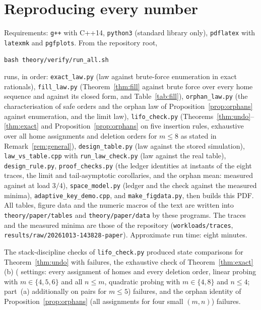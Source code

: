 \documentclass[11pt,a4paper]{article}
\theoremstyle{definition}
\theoremstyle{remark}
\newcommand{\code}[1]{\texttt{#1}}
\begin{document}
\section{Reproducing every number}\label{app:repro}\sloppy
Requirements: \code{g++} with C++14, \code{python3} (standard library only), \code{pdflatex} with \code{latexmk} and \code{pgfplots}. From the repository root,
\begin{center}\code{bash theory/verify/run\_all.sh}\end{center}
runs, in order: \code{exact\_law.py} (law against brute-force enumeration in exact rationals), \code{fill\_law.py} (Theorem~\ref{thm:fill} against brute force over every home sequence and against its closed form, and Table~\ref{tab:fill}), \code{orphan\_law.py} (the characterisation of safe orders and the orphan law of Proposition~\ref{prop:orphans} against enumeration, and the limit law), \code{lifo\_check.py} (Theorems~\ref{thm:undo}--\ref{thm:exact} and Proposition~\ref{prop:orphans} on five insertion rules, exhaustive over all home assignments and deletion orders for $m\le8$ as stated in Remark~\ref{rem:general}), \code{design\_table.py} (law against the stored simulation), \code{law\_vs\_table.cpp} with \code{run\_law\_check.py} (law against the real table), \code{design\_rule.py}, \code{proof\_checks.py} (the ledger identities at \LedgerInstants{} instants of the eight traces, the limit and tail-asymptotic corollaries, and the orphan mean: measured \OrphanMeasured{} against \OrphanTheory{} at load $3/4$), \code{space\_model.py} (ledger and the check against the measured minima), \code{adaptive\_key\_demo.cpp}, and \code{make\_figdata.py}, then builds this PDF. All tables, figure data and the numeric macros of the text are written into \code{theory/paper/tables} and \code{theory/paper/data} by these programs. The traces and the measured minima are those of the repository (\code{workloads/traces}, \code{results/raw/20261013-143828-paper}). Approximate run time: eight minutes.

The stack-discipline checks of \code{lifo\_check.py} produced \UndoComparisons{} state comparisons for Theorem~\ref{thm:undo} with \UndoFailures{} failures, the exhaustive check of Theorem~\ref{thm:exact}(b) (\ExactnessCases{} settings: every assignment of homes and every deletion order, linear probing with $m\in\{4,5,6\}$ and all $n\le m$, quadratic probing with $m\in\{4,8\}$ and $n\le4$; part~(a) additionally on \SafeOrderPairs{} pairs for $m\le5$) \ExactnessFailures{} failures, and the orphan identity of Proposition~\ref{prop:orphans} (all assignments for four small $(m,n)$) \OrphanFailures{} failures.
\end{document}
